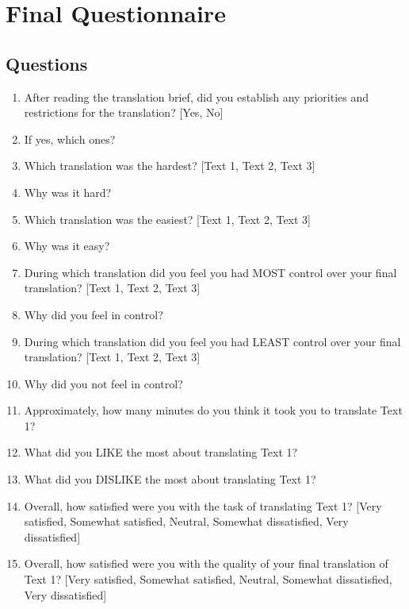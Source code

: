 \newpage

\section{Final Questionnaire}

\subsection{Questions}


\begin{enumerate}
    \item After reading the translation brief, did you establish any priorities and restrictions for the translation? [Yes, No]
    \item If yes, which ones?
    \item Which translation was the hardest? [Text 1, Text 2, Text 3]
    \item Why was it hard?
    \item Which translation was the easiest? [Text 1, Text 2, Text 3]
    \item Why was it easy?
    \item During which translation did you feel you had MOST control over your final translation? [Text 1, Text 2, Text 3]
    \item Why did you feel in control?
    \item During which translation did you feel you had LEAST control over your final translation? [Text 1, Text 2, Text 3]
    \item Why did you not feel in control?
    \item Approximately, how many minutes do you think it took you to translate Text 1?
    \item What did you LIKE the most about translating Text 1?
    \item What did you DISLIKE the most about translating Text 1?
    \item Overall, how satisfied were you with the task of translating Text 1? [Very satisfied, Somewhat satisfied, Neutral, Somewhat dissatisfied, Very dissatisfied]
    \item Overall, how satisfied were you with the quality of your final translation of Text 1? [Very satisfied, Somewhat satisfied, Neutral, Somewhat dissatisfied, Very dissatisfied]

\end{enumerate}

